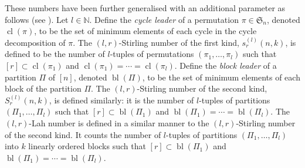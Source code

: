 \documentclass{article}
\newcommand{\SSS}{\mathfrak{S}}
\DeclareMathOperator{\cl}{cl}
\DeclareMathOperator{\bl}{bl}
\theoremstyle{definition}
\numberwithin{equation}{section}
\begin{document}
These numbers have been further generalised with an additional parameter as follows (see \cite{lr-stir-ref,aleks-gen-lah}).
Let $l \in \mathbb{N}$.
Define the \emph{cycle leader} of a permutation $\pi \in \SSS_n$, denoted $\cl(\pi)$, to be the set of minimum elements 
of each cycle in the cycle decomposition of $\pi$.
The $(l,r)$-Stirling number of the first kind, $s_r^{(l)}(n,k)$, is defined to be the number of $l$-tuples of permutations
 $(\pi_1,\dotsc,\pi_l)$ such that $[r]\subset \cl(\pi_1)$ and $\cl(\pi_1)=\dotsb=\cl(\pi_l)$. 
Define the \emph{block leader} of a partition $\Pi$ of $[n]$, denoted $\bl(\Pi)$, to be the set of minimum elements of each
 block of the partition $\Pi$.
The $(l,r)$-Stirling number of the second kind, $S_r^{(l)}(n,k)$, is defined similarly: it is the number of $l$-tuples of 
partitions $(\Pi_1,\dotsc,\Pi_l)$ such that $[r]\subset \bl(\Pi_1)$ and $\bl(\Pi_1)=\dotsb=\bl(\Pi_l)$. 
The $(l,r)$-Lah number is defined in a similar manner to the $(l,r)$-Stirling number of the second kind.
It counts the number of $l$-tuples of partitions $(\Pi_1,\dotsc,\Pi_l)$ into $k$ linearly ordered blocks such 
that $[r]\subset \bl(\Pi_1)$ and $\bl(\Pi_1)=\dotsb=\bl(\Pi_l)$.



\end{document}
